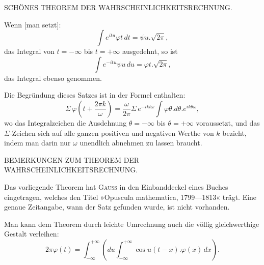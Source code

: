 \clearpage
{}%

\begin{center}
\large SCH\"ONES THEOREM DER WAHRSCHEINLICHKEITSRECHNUNG.
\end{center}

\noindent\hspace*{\parindent}Wenn [man setzt]:
\[
\int e^{itu}\varphi t\,dt = \psi u \mathord{.} \sqrt{2\pi},
\]
\noindent das Integral von $t=-\infty$ bis $t=+\infty$ ausgedehnt, so ist
\[
\int e^{-itu}\psi u\,du = \varphi t \mathord{.} \sqrt{2\pi},
\]
\noindent das Integral ebenso genommen.

Die Begr\"undung dieses Satzes ist in der Formel enthalten:
\[
\Sigma\,\varphi\!\left(t+\frac{2\pi k}{\omega}\right) = \frac{\omega}{2\pi}\Sigma\, e^{-ikt\omega}\int \varphi\theta\mathord{.} d\theta\mathord{.} e^{ik\theta\omega},
\]
\noindent wo das Integralzeichen die Ausdehnung $\theta=-\infty$ bis $\theta=+\infty$ voraussetzt, und das $\Sigma$-Zeichen sich auf alle ganzen positiven und negativen Werthe von $k$ bezieht, indem man darin nur $\omega$ unendlich abnehmen zu lassen braucht.

\begin{center}
BEMERKUNGEN ZUM THEOREM DER WAHRSCHEINLICHKEITSRECHNUNG.
\end{center}

\noindent\hspace*{\parindent}Das vorliegende Theorem hat \textsc{Gauss} in den Einbanddeckel eines Buches eingetragen, welches den Titel »Opuscula mathematica, 1799---1813« tr\"agt. Eine genaue Zeitangabe, wann der Satz gefunden wurde, ist nicht vorhanden.

Man kann dem Theorem durch leichte Umrechnung auch die v\"ollig gleichwerthige Gestalt verleihen:
\[
2\pi\varphi(t) = \int^{+\infty}_{-\infty}\!\left(du\int^{+\infty}_{-\infty}\!\cos u(t-x)\mathord{.}\varphi(x)\,dx\right).
\]
